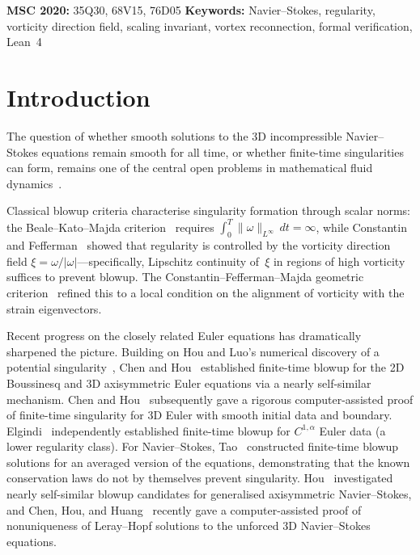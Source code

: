 \documentclass[11pt,a4paper]{article}
\theoremstyle{definition}
\newcommand{\NS}{Navier--Stokes}
\newcommand{\norm}[1]{\lVert #1 \rVert}
\newcommand{\abs}[1]{\lvert #1 \rvert}
\begin{document}
\smallskip\noindent
\textbf{MSC 2020:} 35Q30, 68V15, 76D05 \hfill
\textbf{Keywords:} \NS{}, regularity, vorticity direction field,
scaling invariant, vortex reconnection, formal verification, Lean~4

\section{Introduction}\label{sec:intro}

The question of whether smooth solutions to the 3D incompressible
\NS{} equations remain smooth for all time, or whether finite-time
singularities can form, remains one of the central open problems in
mathematical fluid dynamics~\cite{DG1995, MB2002}.

Classical blowup criteria characterise singularity formation through
scalar norms: the Beale--Kato--Majda criterion~\cite{BKM1984}
requires $\int_0^T\norm{\omega}_{L^\infty}\,dt = \infty$, while
Constantin and Fefferman~\cite{CF1993} showed that regularity is
controlled by the vorticity direction field
$\xi = \omega/\abs{\omega}$---specifically, Lipschitz continuity
of~$\xi$ in regions of high vorticity suffices to prevent blowup.
The Constantin--Fefferman--Majda geometric criterion~\cite{CFM1996}
refined this to a local condition on the alignment of vorticity
with the strain eigenvectors.

Recent progress on the closely related Euler equations has
dramatically sharpened the picture.  Building on Hou and Luo's
numerical discovery of a potential singularity~\cite{HouLuo2014},
Chen and Hou~\cite{ChenHou2023} established finite-time blowup for
the 2D Boussinesq and 3D axisymmetric Euler equations via a nearly
self-similar mechanism.  Chen and Hou~\cite{ChenHou2025} subsequently
gave a rigorous computer-assisted proof of finite-time singularity
for 3D Euler with smooth initial data and boundary.
Elgindi~\cite{Elgindi2021} independently established finite-time
blowup for $C^{1,\alpha}$ Euler data (a lower regularity class).
For \NS{}, Tao~\cite{Tao2016} constructed finite-time blowup
solutions for an averaged version of the equations, demonstrating
that the known conservation laws do not by themselves prevent
singularity.  Hou~\cite{Hou2025} investigated nearly self-similar
blowup candidates for generalised axisymmetric \NS{}, and
Chen, Hou, and Huang~\cite{CHH2025} recently gave a
computer-assisted proof of nonuniqueness of Leray--Hopf solutions
to the unforced 3D \NS{} equations.
\end{document}
